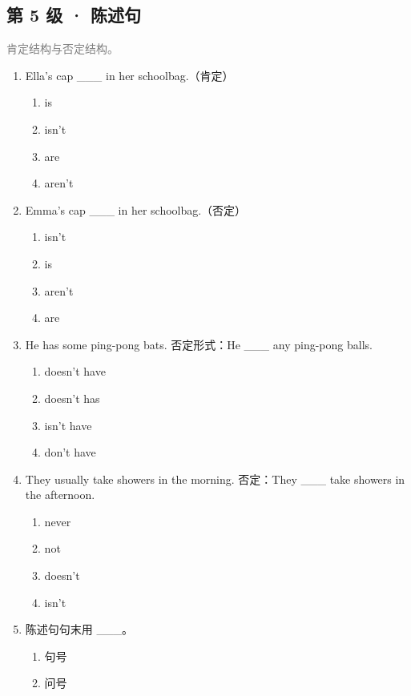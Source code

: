 \documentclass[11pt,a4paper]{ctexart}
\begin{document}
\subsection*{第 5 级 · 陈述句}
\noindent\textcolor{gray}{肯定结构与否定结构。}\par\smallskip
\begin{enumerate}[leftmargin=*,itemsep=4pt]
\item Ella’s cap \_\_\_ in her schoolbag.（肯定）
\begin{enumerate}[label=\Alph*.,leftmargin=2em,itemsep=1pt,topsep=2pt]
\item is
\item isn’t
\item are
\item aren’t
\end{enumerate}
\item Emma’s cap \_\_\_ in her schoolbag.（否定）
\begin{enumerate}[label=\Alph*.,leftmargin=2em,itemsep=1pt,topsep=2pt]
\item isn’t
\item is
\item aren’t
\item are
\end{enumerate}
\item He has some ping-pong bats. 否定形式：He \_\_\_ any ping-pong balls.
\begin{enumerate}[label=\Alph*.,leftmargin=2em,itemsep=1pt,topsep=2pt]
\item doesn’t have
\item doesn’t has
\item isn’t have
\item don’t have
\end{enumerate}
\item They usually take showers in the morning. 否定：They \_\_\_ take showers in the afternoon.
\begin{enumerate}[label=\Alph*.,leftmargin=2em,itemsep=1pt,topsep=2pt]
\item never
\item not
\item doesn’t
\item isn’t
\end{enumerate}
\item 陈述句句末用 \_\_\_。
\begin{enumerate}[label=\Alph*.,leftmargin=2em,itemsep=1pt,topsep=2pt]
\item 句号
\item 问号

\end{enumerate}
\end{enumerate}
\end{document}
